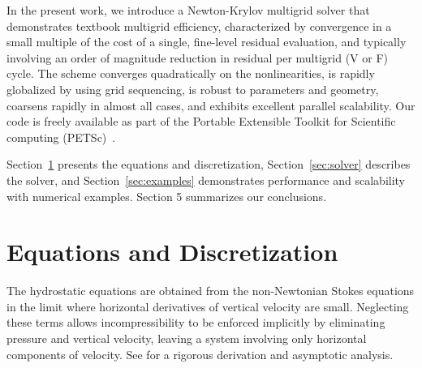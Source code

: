 \documentclass[draft,lineno,jgrga]{AGUTeX}
\begin{document}
\begin{article}
In the present work, we introduce a Newton-Krylov multigrid solver that demonstrates textbook
multigrid efficiency, characterized by convergence in a small multiple of the cost of a single,
fine-level residual evaluation, and typically involving an order of magnitude reduction in residual
per multigrid (V or F) cycle.  The scheme converges quadratically on the nonlinearities, is rapidly
globalized by using grid sequencing, is robust to parameters and geometry, coarsens rapidly in
almost all cases, and exhibits excellent parallel scalability.  Our code is freely available as part
of the Portable Extensible Toolkit for Scientific computing (PETSc)~\citep{petsc-web-page}.

Section~\ref{sec:equations} presents the equations and discretization, Section~\ref{sec:solver} describes the solver, and Section~\ref{sec:examples} demonstrates performance and scalability with numerical examples. Section 5 summarizes our conclusions.

\section{Equations and Discretization}\label{sec:equations}
The hydrostatic equations are obtained from the non-Newtonian Stokes equations in the limit where
horizontal derivatives of vertical velocity are small.  Neglecting these terms allows
incompressibility to be enforced implicitly by eliminating pressure and vertical velocity, leaving a
system involving only horizontal components of velocity.  See \cite{schoof2010thin} for a rigorous
derivation and asymptotic analysis.


\end{article}
\end{document}
